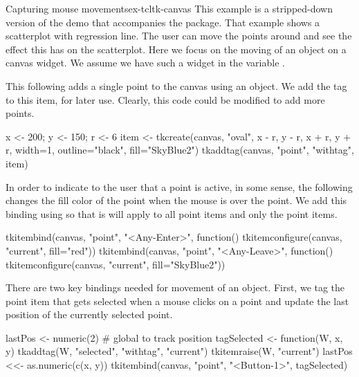 \begin{example}{Capturing mouse movements}{ex-tcltk-canvas}
This example is a stripped-down version of the  demo
that accompanies the  package. That example shows a
scatterplot with regression line. The user can move the points around
and see the effect this has on the scatterplot. Here we focus on the
moving of an object on a canvas widget. We assume we have such a
widget in the variable .


This following adds a single point to the canvas using an
 object. We add the  tag to this item, for
later use. Clearly, this code could be modified to add more points.
\begin{Schunk}
\begin{Sinput}
 x <- 200; y <- 150; r <- 6
 item <- tkcreate(canvas, "oval", x - r, y - r, x + r, y + r,
                  width=1, outline="black",
                  fill="SkyBlue2")
 tkaddtag(canvas, "point", "withtag", item)
\end{Sinput}
\end{Schunk}

In order to indicate to the user that a point is active, in some
sense, the following changes the fill color of the point when the
mouse is over the point.  We add this binding using 
so that is will apply to all point items and only the point items.
\begin{Schunk}
\begin{Sinput}
 tkitembind(canvas, "point", "<Any-Enter>", function()
            tkitemconfigure(canvas, "current", fill="red"))
 tkitembind(canvas, "point", "<Any-Leave>", function()
            tkitemconfigure(canvas, "current", fill="SkyBlue2"))
\end{Sinput}
\end{Schunk}

There are two key bindings needed for movement of an object. First, we
tag the point item that gets selected when a mouse clicks on a point
and update the last position of the currently selected point.
\begin{Schunk}
\begin{Sinput}
 lastPos <- numeric(2)            # global to track position
 tagSelected <- function(W, x, y) {
   tkaddtag(W,  "selected",  "withtag",  "current")
   tkitemraise(W, "current")
   lastPos <<- as.numeric(c(x, y))
 }
 tkitembind(canvas, "point", "<Button-1>",  tagSelected)
\end{Sinput}
\end{Schunk}


\end{example}
